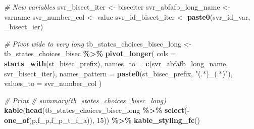 \documentclass[
]{book}
\newenvironment{Shaded}{\begin{snugshade}}{\end{snugshade}}
\newcommand{\CommentTok}[1]{\textcolor[rgb]{0.56,0.35,0.01}{\textit{#1}}}
\newcommand{\DataTypeTok}[1]{\textcolor[rgb]{0.13,0.29,0.53}{#1}}
\newcommand{\DecValTok}[1]{\textcolor[rgb]{0.00,0.00,0.81}{#1}}
\newcommand{\KeywordTok}[1]{\textcolor[rgb]{0.13,0.29,0.53}{\textbf{#1}}}
\newcommand{\NormalTok}[1]{#1}
\newcommand{\OperatorTok}[1]{\textcolor[rgb]{0.81,0.36,0.00}{\textbf{#1}}}
\newcommand{\StringTok}[1]{\textcolor[rgb]{0.31,0.60,0.02}{#1}}
\begin{document}
\begin{Shaded}
\begin{Highlighting}[]
\CommentTok{\# New variables}
\NormalTok{svr\_bisect\_iter \textless{}{-}}\StringTok{ \textquotesingle{}biseciter\textquotesingle{}}
\NormalTok{svr\_abfafb\_long\_name \textless{}{-}}\StringTok{ \textquotesingle{}varname\textquotesingle{}}
\NormalTok{svr\_number\_col \textless{}{-}}\StringTok{ \textquotesingle{}value\textquotesingle{}}
\NormalTok{svr\_id\_bisect\_iter \textless{}{-}}\StringTok{ }\KeywordTok{paste0}\NormalTok{(svr\_id\_var, }\StringTok{\textquotesingle{}\_bisect\_ier\textquotesingle{}}\NormalTok{)}

\CommentTok{\# Pivot wide to very long}
\NormalTok{tb\_states\_choices\_bisec\_long \textless{}{-}}\StringTok{ }\NormalTok{tb\_states\_choices\_bisec }\OperatorTok{\%\textgreater{}\%}
\StringTok{  }\KeywordTok{pivot\_longer}\NormalTok{(}
    \DataTypeTok{cols =} \KeywordTok{starts\_with}\NormalTok{(st\_bisec\_prefix),}
    \DataTypeTok{names\_to =} \KeywordTok{c}\NormalTok{(svr\_abfafb\_long\_name, svr\_bisect\_iter),}
    \DataTypeTok{names\_pattern =} \KeywordTok{paste0}\NormalTok{(st\_bisec\_prefix, }\StringTok{"(.*)\_(.*)"}\NormalTok{),}
    \DataTypeTok{values\_to =}\NormalTok{ svr\_number\_col}
\NormalTok{  )}

\CommentTok{\# Print}
\CommentTok{\# summary(tb\_states\_choices\_bisec\_long)}
\KeywordTok{kable}\NormalTok{(}\KeywordTok{head}\NormalTok{(tb\_states\_choices\_bisec\_long }\OperatorTok{\%\textgreater{}\%}\StringTok{ }
\StringTok{             }\KeywordTok{select}\NormalTok{(}\OperatorTok{{-}}\KeywordTok{one\_of}\NormalTok{(}\StringTok{\textquotesingle{}p\textquotesingle{}}\NormalTok{,}\StringTok{\textquotesingle{}f\_p\textquotesingle{}}\NormalTok{,}\StringTok{\textquotesingle{}f\_p\_t\_f\_a\textquotesingle{}}\NormalTok{)), }\DecValTok{15}\NormalTok{)) }\OperatorTok{\%\textgreater{}\%}\StringTok{ }
\StringTok{  }\KeywordTok{kable\_styling\_fc}\NormalTok{()}
\end{Highlighting}
\end{Shaded}
\end{document}
